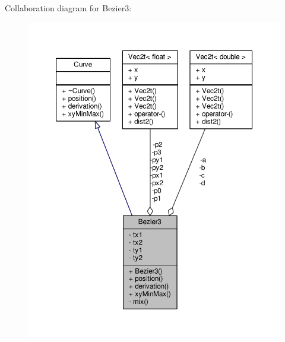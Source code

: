 Collaboration diagram for Bezier3\+:\nopagebreak
\begin{figure}[H]
\begin{center}
\leavevmode
\includegraphics[width=350pt]{classBezier3__coll__graph}
\end{center}
\end{figure}
